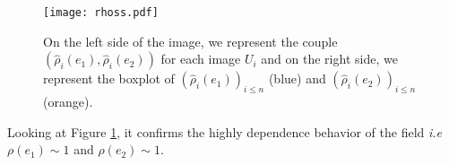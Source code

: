 \documentclass[12pt]{article}
\renewcommand{\hat}{\widehat}
\theoremstyle{Theorem}
\theoremstyle{definition}
\begin{document}
\begin{figure}[H]
  \centering
    {\texttt{[image: rhoss.pdf]}}
    \hspace{0.2cm}
 \caption{On the left side of the image, we represent the couple $\left(\hat{\rho}_{i}(e_1), \hat{\rho}_{i}(e_2)\right)$ for each image $U_{i}$ and on the right side, we represent the boxplot of $(\hat{\rho}_{i}(e_1))_{i \leq n}$ (blue) and $(\hat{\rho}_{i}(e_2))_{i \leq n}$ (orange).}
\label{boxplotrho}
\end{figure}
Looking at Figure \ref{boxplotrho}, it confirms the highly dependence behavior of the field \textit{i.e} $\rho(e_1) \sim 1$ and $\rho(e_2) \sim 1$.
\appendix 
\end{document}
